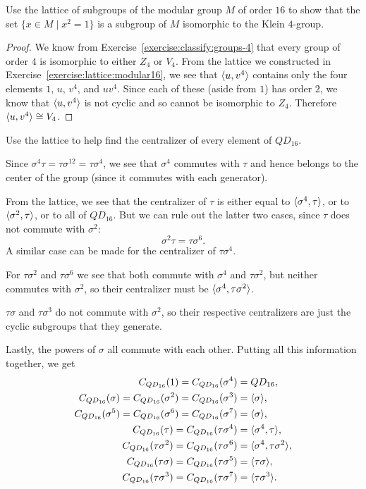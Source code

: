  Use the lattice of subgroups of the modular group $M$ of
order $16$ to show that the set $\{x\in M\mid x^2 = 1\}$ is a subgroup
of $M$ isomorphic to the Klein $4$-group.
\begin{proof}
  We know from Exercise~\ref{exercise:classify:groups-4} that every
  group of order $4$ is isomorphic to either $Z_4$ or $V_4$. From the
  lattice we constructed in Exercise~\ref{exercise:lattice:modular16},
  we see that $\langle{u,v^4}\rangle$ contains only the four elements $1$, $u$,
  $v^4$, and $uv^4$. Since each of these (aside from $1$) has order
  $2$, we know that $\langle{u,v^4}\rangle$ is not cyclic and so cannot be
  isomorphic to $Z_4$. Therefore $\langle{u,v^4}\rangle\cong V_4$.
\end{proof}

 Use the lattice to help find the centralizer of every
element of $QD_{16}$.
\begin{solution}
  Since $\sigma^4\tau = \tau\sigma^{12} = \tau\sigma^4$, we see that
  $\sigma^4$ commutes with $\tau$ and hence belongs to the center of
  the group (since it commutes with each generator).

  From the lattice, we see that the centralizer of $\tau$ is either
  equal to $\langle{\sigma^4,\tau}\rangle$, or to $\langle{\sigma^2,\tau}\rangle$, or to
  all of $QD_{16}$. But we can rule out the latter two cases, since
  $\tau$ does not commute with $\sigma^2$:
  \begin{equation*}
    \sigma^2\tau = \tau\sigma^6.
  \end{equation*}
  A similar case can be made for the centralizer of $\tau\sigma^4$.

  For $\tau\sigma^2$ and $\tau\sigma^6$ we see that both commute with
  $\sigma^4$ and $\tau\sigma^2$, but neither commutes with $\sigma^2$,
  so their centralizer must be $\langle{\sigma^4,\tau\sigma^2}\rangle$.

  $\tau\sigma$ and $\tau\sigma^3$ do not commute with $\sigma^2$, so
  their respective centralizers are just the cyclic subgroups that
  they generate.

  Lastly, the powers of $\sigma$ all commute with each other. Putting
  all this information together, we get
  \begin{align*}
    C_{QD_{16}}(1) = C_{QD_{16}}(\sigma^4) &= QD_{16}, \\
    C_{QD_{16}}(\sigma) = C_{QD_{16}}(\sigma^2)
    = C_{QD_{16}}(\sigma^3) &= \langle{\sigma}\rangle, \\
    C_{QD_{16}}(\sigma^5) = C_{QD_{16}}(\sigma^6)
    = C_{QD_{16}}(\sigma^7) &= \langle{\sigma}\rangle, \\
    C_{QD_{16}}(\tau) = C_{QD_{16}}(\tau\sigma^4) &= \langle{\sigma^4,\tau}\rangle, \\
    C_{QD_{16}}(\tau\sigma^2)
    = C_{QD_{16}}(\tau\sigma^6) &= \langle{\sigma^4,\tau\sigma^2}\rangle, \\
    C_{QD_{16}}(\tau\sigma)
    = C_{QD_{16}}(\tau\sigma^5) &= \langle{\tau\sigma}\rangle, \\
    C_{QD_{16}}(\tau\sigma^3)
    = C_{QD_{16}}(\tau\sigma^7) &= \langle{\tau\sigma^3}\rangle. \qedhere
  \end{align*}
\end{solution}

